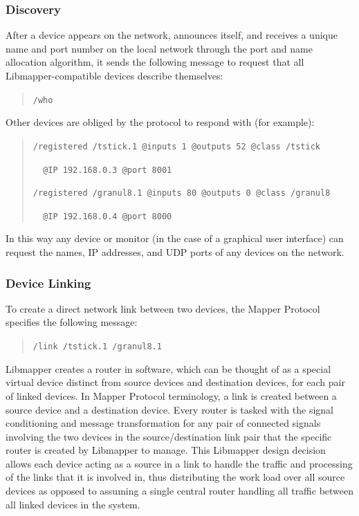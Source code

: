 \subsubsection{Discovery}

After a device appears on the network, announces itself, and receives a unique name and port number on the local network through the port and name allocation algorithm, it sends the following message to request that all Libmapper-compatible devices describe themselves:

\begin{quote}
\verb#/who#
\end{quote}

Other devices are obliged by the protocol to respond with (for example):

\begin{quote}
\verb#/registered /tstick.1 @inputs 1 @outputs 52 @class /tstick# 

\verb#  @IP 192.168.0.3 @port 8001#

\verb#/registered /granul8.1 @inputs 80 @outputs 0 @class /granul8#

\verb#  @IP 192.168.0.4 @port 8000#
\end{quote}

In this way any device or monitor (in the case of a graphical user interface) can request the names, IP addresses, and UDP ports of any devices on the network. 

\subsubsection{Device Linking}

To create a direct network link between two devices, the Mapper Protocol specifies the following message:

\begin{quote}
\verb#/link /tstick.1 /granul8.1#
\end{quote}

Libmapper creates a router in software, which can be thought of as a special virtual device distinct from source devices and destination devices, for each pair of linked devices. In Mapper Protocol terminology, a link is created between a source device and a destination device. Every router is tasked with the signal conditioning and message transformation for any pair of connected signals involving the two devices in the source/destination link pair that the specific router is created by Libmapper to manage. This Libmapper design decision allows each device acting as a source in a link to handle the traffic and processing of the links that it is involved in, thus distributing the work load over all source devices as opposed to assuming a single central router handling all traffic between all linked devices in the system.

